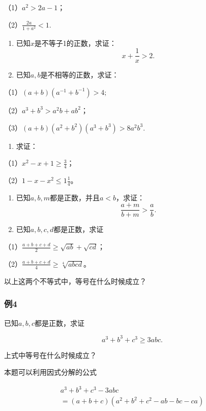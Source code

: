 （1）\(a^2 > 2a - 1\)；

（2）\(\frac{2a}{1 + a^2} < 1.\)

\begin{enumerate}[start=2]
\item
  已知\(x\)是不等子1的正数，求证：
\[
x + \frac{1}{x} > 2.
\]
\item
  已知\(a, b\)是不相等的正数，求证：
\end{enumerate}

（1）\((a + b)(a^{-1} + b^{-1}) > 4;\)

（2）\(a^3 + b^3 > a^2 b + ab^2\)；

（3）\((a + b)(a^2 + b^2)(a^3 + b^3) > 8a^2b^3.\)

\begin{enumerate}[start=4]
\item
  求证：
\end{enumerate}

（1）\(x^2-x+1\geqslant\frac{3}{4}\)；

（2）\(1 - x - x^2 \leqslant 1\frac{1}{4}\)。

\begin{enumerate}[start=5]
\item
  已知\(a, b, m\)都是正数，并且\(a < b\)，求证：
\[
\frac{a+m}{b+m}>\frac{a}{b}.
\]
\item
  已知\(a, b, c, d\)都是正数，求证
\end{enumerate}

（1）\(\frac{a + b + c + d}{2} \geqslant \sqrt{ab} + \sqrt{cd}\)；

（2）\(\frac{a + b + c + d}{4} \geqslant \sqrt[4]{abcd}\)。

以上这两个不等式中，等号在什么时候成立？

\subsubsection{例4}

已知\(a, b, c\)都是正数，求证

\[
a^{3} + b^{3} + c^{3} \geqslant 3 a b c.
\]

上式中等号在什么时候成立？

 本题可以利用因式分解的公式

\[
\begin{array}{l} a^{3} + b^{3} + c^{3} - 3 a b c \\ = (a + b + c) \left(a^{2} + b^{2} + c^{2} - a b - b c - c a\right) \\ \end{array}
\]

